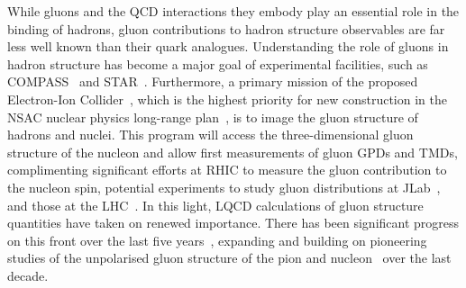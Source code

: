 While gluons and the QCD interactions they embody play an essential role in the binding of hadrons, gluon contributions to hadron structure observables are far less well known than their quark analogues. Understanding the role of gluons in hadron structure has become a major goal of experimental facilities, such as COMPASS~\cite{Adare:2014hsq} and STAR~\cite{Djawotho:2013pga}. Furthermore, a primary mission of the proposed Electron-Ion Collider~\cite{Accardi:2012qut,Kalantarians:2014eda}, which is the highest priority for new construction in the NSAC nuclear physics long-range plan~\cite{Geesaman:2015fha}, is to image the gluon structure of hadrons and nuclei. This program will access the three-dimensional gluon structure of the nucleon and allow first measurements of gluon GPDs and TMDs, complimenting significant efforts at RHIC to measure the gluon contribution to the nucleon spin,  potential experiments to study gluon distributions at JLab~\cite{Maxwell:2018gci,Hattawy:2017woc,Dobbs:2017vjw}, and those at the LHC~\cite{Baltz:2007kq}. 
%
In this light, LQCD calculations of gluon structure quantities have taken on renewed importance. There has been significant progress on this front over the last five years~\cite{Alexandrou:2017oeh,Yang:2016plb,Detmold:2016gpy,Detmold:2017oqb,Winter:2017bfs,Alexandrou:2016ekb}, expanding and building on pioneering studies of the unpolarised gluon structure of the pion and nucleon~\cite{Meyer:2007tm,Horsley:2012pz,Alexandrou:2013tfa,Deka:2013zha} over the last decade. 

